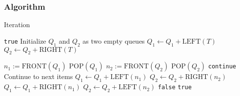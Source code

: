 \subsubsection{Algorithm}
\begin{algorithm}[H]
\caption{Iteration}
\begin{algorithmic}[1]
\State \Return \texttt{true}
\EndIf
\State Initialize $Q_1$ and $Q_2$ as two empty queues
\State $Q_1\gets Q_1 + \text{LEFT}(T)$
\State $Q_2\gets Q_2 + \text{RIGHT}(T)$
\end{algorithmic}
\end{algorithm}
\begin{algorithm}[H]
\begin{algorithmic}[1]
\State $n_1:=\text{FRONT}(Q_1)$
\State $\text{POP}(Q_1)$
\State $n_2:=\text{FRONT}(Q_2)$
\State $\text{POP}(Q_2)$
\State \texttt{continue} \Comment Continue to next items
\EndIf
{}
\State $Q_1\gets Q_1 + \text{LEFT}(n_1)$
\State $Q_2\gets Q_2 + \text{RIGHT}(n_2)$
\State $Q_1\gets Q_1 + \text{RIGHT}(n_1)$
\State $Q_2\gets Q_2 + \text{LEFT}(n_2)$
\Else
\State \Return \texttt{false}
\EndIf
\EndWhile
\State \Return \texttt{true}
\EndProcedure
\end{algorithmic}
\end{algorithm}